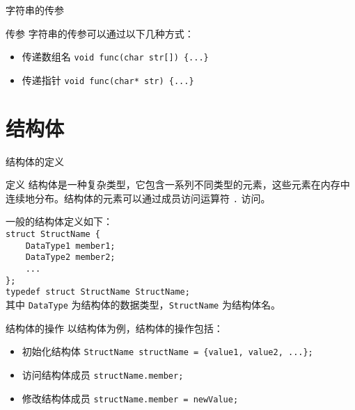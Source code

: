 \documentclass{beamer}
\begin{document}
\begin{frame}{字符串的传参}
    \begin{block}{传参}
        字符串的传参可以通过以下几种方式：
        \begin{itemize}
            \item<1-> 传递数组名
            \texttt{void func(char str[]) \{...\}} \\
            \item<2-> 传递指针
            \texttt{void func(char* str) \{...\}} \\
        \end{itemize}
    \end{block}
\end{frame}

\section{结构体}
\begin{frame}{结构体的定义}
    \begin{block}{定义}
        结构体是一种复杂类型，它包含一系列不同类型的元素，这些元素在内存中连续地分布。结构体的元素可以通过成员访问运算符 \texttt{.} 访问。
    \end{block}
    一般的结构体定义如下： \\
    \texttt{struct StructName \{} \\
    \texttt{\ \ \ \ DataType1 member1;} \\
    \texttt{\ \ \ \ DataType2 member2;} \\
    \texttt{\ \ \ \ ...} \\
    \texttt{\};} \\
    \texttt{typedef struct StructName StructName;} \\
    其中 \texttt{DataType} 为结构体的数据类型，\texttt{StructName} 为结构体名。
\end{frame}

\begin{frame}{结构体的操作}
    以结构体为例，结构体的操作包括：
    \begin{itemize}
        \item<1-> 初始化结构体
        \texttt{StructName structName = \{value1, value2, ...\};} \\
        \item<2-> 访问结构体成员
        \texttt{structName.member;} \\
        \item<3-> 修改结构体成员
        \texttt{structName.member = newValue;} \\
    \end{itemize}
\end{frame}
\end{document}

